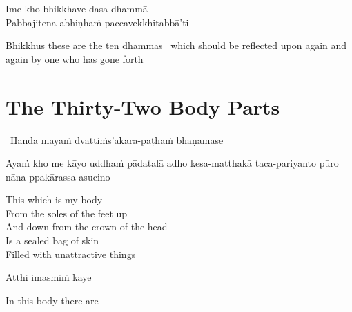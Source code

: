 Ime kho bhikkhave dasa dhammā\\
Pabbajitena abhiṇhaṁ paccavekkhitabbā'ti

\begin{english-hang-verses}
  Bhikkhus these are the ten dhammas \breathmark\ which should be reflected upon again and again by one who has gone forth
\end{english-hang-verses}

\suttaRef{[AN 10.48]}




\section{The Thirty-Two Body Parts}
\label{32-parts}

\begin{leader}
  \anglebracketleft\ \hspace{-0.5mm}Handa mayaṁ dvattiṁs'ākāra-pāṭhaṁ bhaṇāmase \hspace{-0.5mm}\anglebracketright\
\end{leader}

\begin{pali-hang}
  Ayaṁ kho me kāyo uddhaṁ pādatalā adho kesa-matthakā taca-pariyanto pūro nāna-ppakārassa asucino
\end{pali-hang}

\begin{english-verses}
  This which is my body\\
  From the soles of the feet up\\
  And down from the crown of the head\\
  Is a sealed bag of skin\\
  Filled with unattractive things
\end{english-verses}

Atthi imasmiṁ kāye

\begin{english}
  In this body there are
\end{english}

